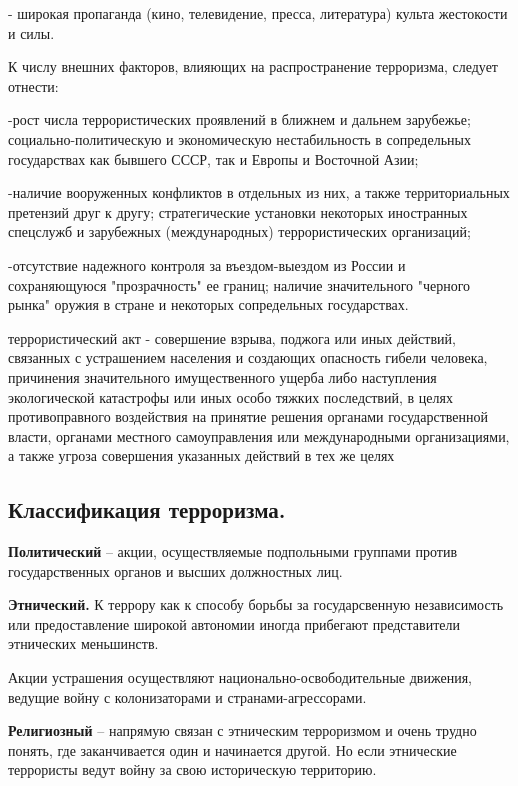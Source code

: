 \documentclass[a4paper, 12pt]{article}
\theoremstyle{definition}
\begin{document}
        - широкая пропаганда (кино, телевидение, пресса, литература) культа жестокости и силы.

        К числу внешних факторов, влияющих на распространение терроризма, следует отнести: 

        -рост числа террористических проявлений в ближнем и дальнем зарубежье; социально-политическую и экономическую нестабильность в сопредельных государствах как бывшего СССР, так и Европы и Восточной Азии; 

        -наличие вооруженных конфликтов в отдельных из них, а также территориальных претензий друг к другу; стратегические установки некоторых иностранных спецслужб и зарубежных (международных) террористических организаций; 

        -отсутствие надежного контроля за въездом-выездом из России и\\ сохраняющуюся "прозрачность" ее границ; наличие значительного "черного\\ рынка" оружия в стране и
        некоторых сопредельных государствах.

        террористический акт - совершение взрыва, поджога или иных действий, связанных с устрашением населения и создающих опасность гибели человека, причинения значительного имущественного ущерба либо наступления экологической катастрофы или иных особо тяжких последствий, в целях противоправного воздействия на принятие решения органами государственной власти, органами местного самоуправления или международными организациями, а также угроза совершения указанных действий в тех же целях

        \subsection*{Классификация терроризма.}

        \textbf{Политический} -- акции, осуществляемые подпольными группами против государственных органов и высших должностных лиц.
        
        \textbf{Этнический.} К террору как к способу борьбы за государсвенную независимость или предоставление широкой автономии иногда прибегают представители этнических меньшинств.
        
        Акции устрашения осуществляют национально-освободительные движения, ведущие войну с колонизаторами и странами-агрессорами.

        \textbf{Религиозный} -- напрямую связан с этническим терроризмом и очень трудно понять, где заканчивается один и начинается другой. Но если этнические террористы ведут войну за свою историческую территорию. 
\end{document}
